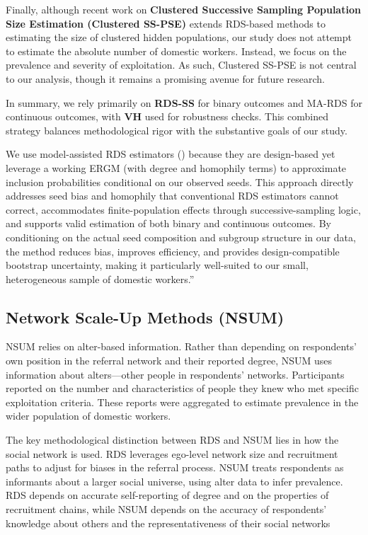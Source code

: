 \documentclass[
  12pt,
  letterpaper,
  DIV=11,
  numbers=noendperiod]{scrartcl}
\theoremstyle{plain}
\theoremstyle{definition}
\begin{document}
Finally, although recent work on \textbf{Clustered Successive Sampling
Population Size Estimation (Clustered SS-PSE)}
\textcite{gamb23-clustered} extends RDS-based methods to estimating the
size of clustered hidden populations, our study does not attempt to
estimate the absolute number of domestic workers. Instead, we focus on
the prevalence and severity of exploitation. As such, Clustered SS-PSE
is not central to our analysis, though it remains a promising avenue for
future research.

In summary, we rely primarily on \textbf{RDS-SS} for binary outcomes and
MA-RDS for continuous outcomes, with \textbf{VH} used for robustness
checks. This combined strategy balances methodological rigor with the
substantive goals of our study.

We use model-assisted RDS estimators (\textcite{gile15-network}) because
they are design-based yet leverage a working ERGM (with degree and
homophily terms) to approximate inclusion probabilities conditional on
our observed seeds. This approach directly addresses seed bias and
homophily that conventional RDS estimators cannot correct, accommodates
finite-population effects through successive-sampling logic, and
supports valid estimation of both binary and continuous outcomes. By
conditioning on the actual seed composition and subgroup structure in
our data, the method reduces bias, improves efficiency, and provides
design-compatible bootstrap uncertainty, making it particularly
well-suited to our small, heterogeneous sample of domestic workers.''

\subsection{Network Scale-Up Methods
(NSUM)}\label{network-scale-up-methods-nsum}

NSUM relies on alter-based information. Rather than depending on
respondents' own position in the referral network and their reported
degree, NSUM uses information about alters---other people in
respondents' networks. Participants reported on the number and
characteristics of people they knew who met specific exploitation
criteria. These reports were aggregated to estimate prevalence in the
wider population of domestic workers.

The key methodological distinction between RDS and NSUM lies in how the
social network is used. RDS leverages ego-level network size and
recruitment paths to adjust for biases in the referral process. NSUM
treats respondents as informants about a larger social universe, using
alter data to infer prevalence. RDS depends on accurate self-reporting
of degree and on the properties of recruitment chains, while NSUM
depends on the accuracy of respondents' knowledge about others and the
representativeness of their social networks
\end{document}
